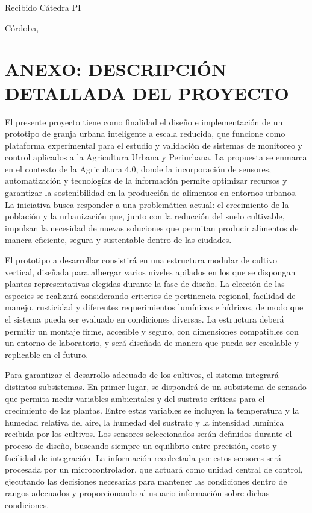 \vspace{0.5cm}
\noindent Recibido Cátedra PI \underline{\hspace{4cm}}

\noindent Córdoba, \underline{\hspace{4cm}}

\vspace{1cm}


\section*{ANEXO: DESCRIPCIÓN DETALLADA DEL PROYECTO}

El presente proyecto tiene como finalidad el diseño e implementación de un prototipo de granja urbana inteligente a escala reducida, que funcione como plataforma experimental para el estudio y validación de sistemas de monitoreo y control aplicados a la Agricultura Urbana y Periurbana. La propuesta se enmarca en el contexto de la Agricultura 4.0, donde la incorporación de sensores, automatización y tecnologías de la información permite optimizar recursos y garantizar la sostenibilidad en la producción de alimentos en entornos urbanos. La iniciativa busca responder a una problemática actual: el crecimiento de la población y la urbanización que, junto con la reducción del suelo cultivable, impulsan la necesidad de nuevas soluciones que permitan producir alimentos de manera eficiente, segura y sustentable dentro de las ciudades.

El prototipo a desarrollar consistirá en una estructura modular de cultivo vertical, diseñada para albergar varios niveles apilados en los que se dispongan plantas representativas elegidas durante la fase de diseño. La elección de las especies se realizará considerando criterios de pertinencia regional, facilidad de manejo, rusticidad y diferentes requerimientos lumínicos e hídricos, de modo que el sistema pueda ser evaluado en condiciones diversas. La estructura deberá permitir un montaje firme, accesible y seguro, con dimensiones compatibles con un entorno de laboratorio, y será diseñada de manera que pueda ser escalable y replicable en el futuro.

Para garantizar el desarrollo adecuado de los cultivos, el sistema integrará distintos subsistemas. En primer lugar, se dispondrá de un subsistema de sensado que permita medir variables ambientales y del sustrato críticas para el crecimiento de las plantas. Entre estas variables se incluyen la temperatura y la humedad relativa del aire, la humedad del sustrato y la intensidad lumínica recibida por los cultivos. Los sensores seleccionados serán definidos durante el proceso de diseño, buscando siempre un equilibrio entre precisión, costo y facilidad de integración. La información recolectada por estos sensores será procesada por un microcontrolador, que actuará como unidad central de control, ejecutando las decisiones necesarias para mantener las condiciones dentro de rangos adecuados y proporcionando al usuario información sobre dichas condiciones. 

